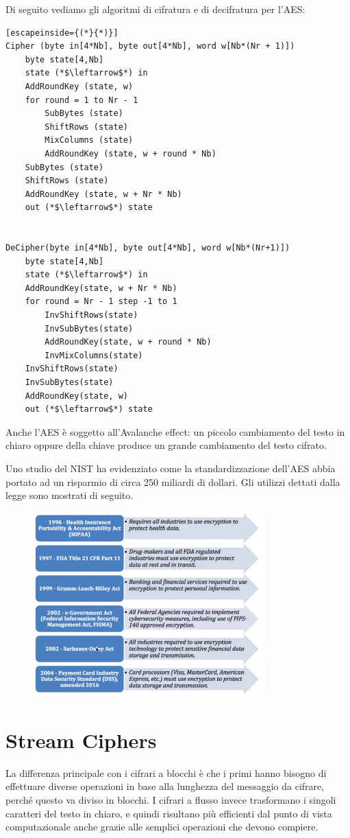 Di seguito vediamo gli algoritmi di cifratura e di decifratura per l'AES:

\begin{lstlisting}[escapeinside={(*}{*)}]
Cipher (byte in[4*Nb], byte out[4*Nb], word w[Nb*(Nr + 1)])
    byte state[4,Nb]
    state (*$\leftarrow$*) in
    AddRoundKey (state, w)
    for round = 1 to Nr - 1
        SubBytes (state)
        ShiftRows (state)
        MixColumns (state)
        AddRoundKey (state, w + round * Nb)
    SubBytes (state)
    ShiftRows (state)
    AddRoundKey (state, w + Nr * Nb)
    out (*$\leftarrow$*) state
    
    
DeCipher(byte in[4*Nb], byte out[4*Nb], word w[Nb*(Nr+1)])
    byte state[4,Nb]
    state (*$\leftarrow$*) in
    AddRoundKey(state, w + Nr * Nb)
    for round = Nr - 1 step -1 to 1
        InvShiftRows(state)
        InvSubBytes(state)
        AddRoundKey(state, w + round * Nb)
        InvMixColumns(state)
    InvShiftRows(state)
    InvSubBytes(state)
    AddRoundKey(state, w)
    out (*$\leftarrow$*) state  
\end{lstlisting}

Anche l'AES è soggetto all'Avalanche effect: un piccolo cambiamento del testo in chiaro oppure della chiave produce un grande cambiamento del testo cifrato. 

Uno studio del NIST ha evidenziato come la standardizzazione dell'AES abbia portato ad un risparmio di circa 250 miliardi di dollari. Gli utilizzi dettati dalla legge sono mostrati di seguito.

\begin{figure}[htb!]
    \centering
    \includegraphics[width=9cm]{./Images/cap1/1.29.png}
\end{figure} 

\section{Stream Ciphers}
La differenza principale con i cifrari a blocchi è che i primi hanno bisogno di effettuare diverse operazioni in base alla lunghezza del messaggio da cifrare, perché questo va diviso in blocchi. I cifrari a flusso invece trasformano i singoli caratteri del testo in chiaro, e quindi risultano più efficienti dal punto di vista computazionale anche grazie alle semplici operazioni che devono compiere.

